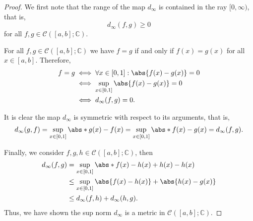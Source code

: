 \begin{proof}
    We first note that the range of the map \(d_\infty\) is contained in the ray \([0, \infty)\), that is,
    \begin{equation*}
        d_\infty(f,g) \geq 0
    \end{equation*}
    for all \(f,g \in \mathcal{C}([a,b];\mathbb{C})\).

    For all \(f, g \in \mathcal{C}([a,b]; \mathbb{C})\) we have \(f = g\) if and only if \(f(x) = g(x)\) for all \(x \in [a,b]\). Therefore,
    \begin{align*}
        f = g &\iff \forall x \in [0,1] : \abs{f(x) - g(x)} = 0\\
              &\iff \sup_{x \in [0,1]}  \abs{f(x) - g(x)} = 0\\
              &\iff d_\infty(f,g) = 0.
    \end{align*}

    It is clear the map \(d_\infty\) is symmetric with respect to its arguments, that is,
    \begin{align*}
        d_\infty(g,f) = \sup_{x\in[0,1]}\abs*{g(x) - f(x)}= \sup_{x\in[0,1]} \abs*{f(x) - g(x)} = d_\infty(f,g).
    \end{align*}

    Finally, we consider \(f,g,h \in \mathcal{C}([a,b];\mathbb{C})\), then
    \begin{align*}
        d_\infty(f,g) &= \sup_{x\in[0,1]}\abs*{f(x) - h(x) + h(x) - h(x)}\\\
                      &\leq \sup_{x\in[0,1]} \abs{f(x) - h(x)} + \abs{h(x) - g(x)}\\
                      &\leq d_\infty(f,h) + d_\infty(h,g).
    \end{align*}
    Thus, we have shown the sup norm \(d_\infty\) is a metric in \(\mathcal{C}([a,b];\mathbb{C})\).
\end{proof}


